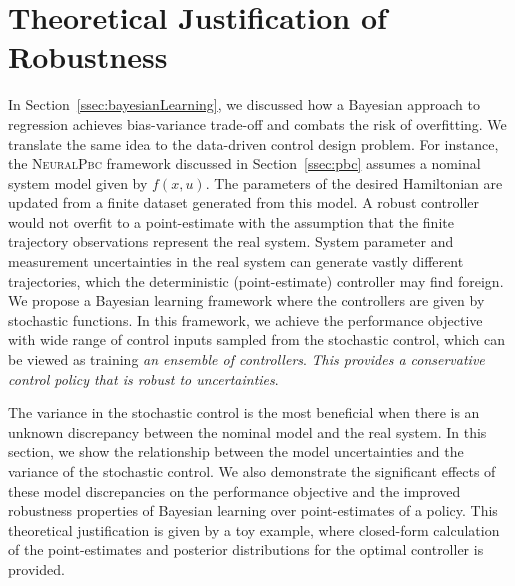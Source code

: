 \section{Theoretical Justification of Robustness}
\label{sec:bl_justification}

In Section~\ref{ssec:bayesianLearning}, we discussed how a Bayesian approach to
regression achieves bias-variance trade-off and combats the risk of overfitting. 
%
We translate the same idea to the data-driven control design problem.
%
For instance, the \textsc{NeuralPbc} framework discussed in
Section~\ref{ssec:pbc} assumes a nominal system model given by $f(x, u)$.
%
The parameters of the desired Hamiltonian are updated from a finite dataset
generated from this model.
%
A robust controller would not overfit to a point-estimate with the assumption
that the finite trajectory observations represent the real system. 
%
System parameter and measurement uncertainties in the real system can generate
vastly different trajectories, which the deterministic (point-estimate)
controller may find foreign.
%
We propose a Bayesian learning framework where the controllers are given by
stochastic functions.
%
In this framework, we achieve the performance objective with wide range of
control inputs sampled from the stochastic control, which can be viewed as
training \textit{an ensemble of controllers}.
%
\textit{This provides a conservative control policy that is robust to uncertainties}.


The variance in the stochastic control is the most beneficial when there is an
unknown discrepancy between the nominal model and the real system.
%
In this section, we show the relationship between the model uncertainties and
the variance of the stochastic control.
%
We also demonstrate the significant effects of these model discrepancies on the
performance objective and the improved robustness properties of Bayesian
learning over point-estimates of a policy. This theoretical justification is
given by a toy example, where closed-form calculation of the point-estimates and
posterior distributions for the optimal controller is provided.

